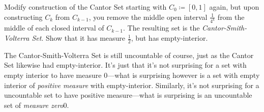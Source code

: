 \begin{exm}
\begin{exr}
Modify construction of the Cantor Set starting with $C_0\coloneqq [0,1]$ again, but upon constructing $C_k$ from $C_{k-1}$, you remove the middle open interval $\frac{1}{4^k}$ from the middle of each closed interval of $C_{k-1}$.  The resulting set is the \emph{Cantor-Smith-Volterra Set}.  Show that it has measure $\frac{1}{2}$, but has empty-interior.
\end{exr}
\begin{rmk}
The Cantor-Smith-Volterra Set is still uncountable of course, just as the Cantor Set likewise had empty-interior.  It's just that it's not surprising for a set with empty interior to have measure $0$---what is surprising however is a set with empty interior of \emph{positive measure} with empty-interior.  Similarly, it's not surprising for a uncountable set to have positive measure---what is surprising is an uncountable set of \emph{measure zero}0.
\end{rmk}
\end{exm}
